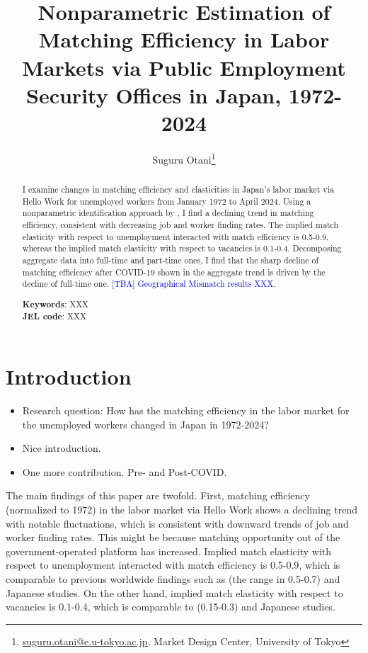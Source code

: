 \documentclass[12pt]{article}
\begin{document}
\title{Nonparametric Estimation of Matching Efficiency in Labor Markets via Public Employment Security Offices in Japan, 1972-2024}
\author{Suguru Otani\thanks{\href{mailto:}{suguru.otani@e.u-tokyo.ac.jp}, Market Design Center, University of Tokyo}}
\maketitle

\begin{abstract}
\noindent
I examine changes in matching efficiency and elasticities in Japan's labor market via Hello Work for unemployed workers from January 1972 to April 2024. 
Using a nonparametric identification approach by \cite{lange2020beyond}, I find a declining trend in matching efficiency, consistent with decreasing job and worker finding rates. 
The implied match elasticity with respect to unemployment interacted with match efficiency is 0.5-0.9, whereas the implied match elasticity with respect to vacancies is 0.1-0.4.
Decomposing aggregate data into full-time and part-time ones, I find that the sharp decline of matching efficiency after COVID-19 shown in the aggregate trend is driven by the decline of full-time one.
\textcolor{blue}{[TBA] Geographical Mismatch results XXX}.

\textbf{Keywords}: XXX \\
\textbf{JEL code}: XXX
\end{abstract}

\section{Introduction}

\begin{itemize}
    \item Research question: How has the matching efficiency in the labor market for the unemployed workers changed in Japan in 1972-2024?
    \item Nice introduction.
    \item One more contribution. Pre- and Post-COVID.
\end{itemize}

The main findings of this paper are twofold.
First, matching efficiency (normalized to 1972) in the labor market via  Hello Work shows a declining trend with notable fluctuations, which is consistent with downward trends of job and worker finding rates.
This might be because matching opportunity out of the government-operated platform has increased. 
Implied match elasticity with respect to unemployment interacted with match efficiency is 0.5-0.9, which is comparable to previous worldwide findings such as \cite{petrongolo2001looking} (the range in 0.5-0.7) and Japanese studies.
On the other hand, implied match elasticity with respect to vacancies is 0.1-0.4, which is comparable to \cite{lange2020beyond} (0.15-0.3) and Japanese studies.
\end{document}

